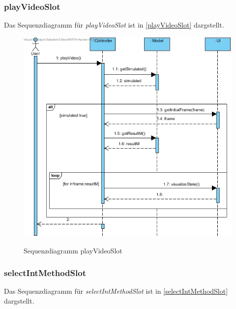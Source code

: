 \subsubsection*{playVideoSlot}

Das Sequenzdiagramm für \emph{playVideoSlot} ist in \ref{playVideoSlot} dargstellt.

\begin{figure}[H]
	\centering
	\includegraphics[scale=.6]{Bilder/Controller__playVideoSlot().jpg}\\
	\caption{Sequenzdiagramm playVideoSlot}
	\label{Sequenzdiagramm playVideoSlot}
\end{figure}

\subsubsection*{selectIntMethodSlot}

Das Sequenzdiagramm für \emph{selectIntMethodSlot} ist in \ref{selectIntMethodSlot} dargstellt.

